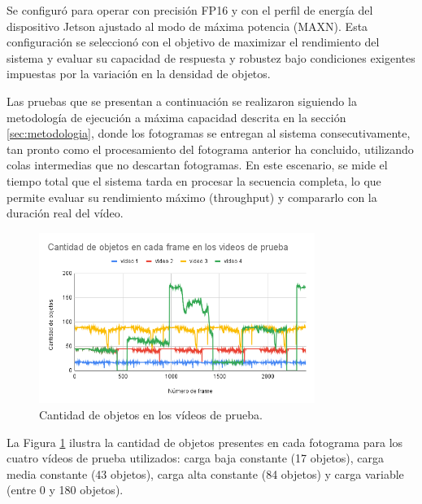 \documentclass[11pt,spanish,listoffigures,listoftables]{tfgetsinf}
\begin{document}
Se configuró para operar con precisión FP16 y con el perfil de energía del dispositivo Jetson ajustado al modo de máxima potencia (MAXN). Esta configuración se seleccionó con el objetivo de maximizar el rendimiento del sistema y evaluar su capacidad de respuesta y robustez bajo condiciones exigentes impuestas por la variación en la densidad de objetos.

Las pruebas que se presentan a continuación se realizaron siguiendo la metodología de ejecución a máxima capacidad descrita en la sección \ref{sec:metodologia}, donde los fotogramas se entregan al sistema consecutivamente, tan pronto como el procesamiento del fotograma anterior ha concluido, utilizando colas intermedias que no descartan fotogramas. En este escenario, se mide el tiempo total que el sistema tarda en procesar la secuencia completa, lo que permite evaluar su rendimiento máximo (throughput) y compararlo con la duración real del vídeo.

\begin{figure}[H]
   \centering
   \includegraphics[width=0.8\textwidth]{images/analisis_de_la_solucion/cantidad_objetos/cantidad_objetos_4_videos.png}
   \caption[Cantidad de objetos en los vídeos de prueba]{Cantidad de objetos en los vídeos de prueba.}
   \label{fig:4_videos}
\end{figure}

La Figura \ref{fig:4_videos} ilustra la cantidad de objetos presentes en cada fotograma para los cuatro vídeos de prueba utilizados: carga baja constante (17 objetos), carga media constante (43 objetos), carga alta constante (84 objetos) y carga variable (entre 0 y 180 objetos).
\end{document}
